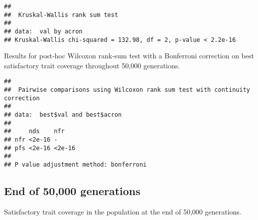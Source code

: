 \documentclass[]{book}
\newenvironment{Shaded}{\begin{snugshade}}{\end{snugshade}}
\newcommand{\DataTypeTok}[1]{\textcolor[rgb]{0.13,0.29,0.53}{#1}}
\newcommand{\KeywordTok}[1]{\textcolor[rgb]{0.13,0.29,0.53}{\textbf{#1}}}
\newcommand{\NormalTok}[1]{#1}
\newcommand{\OperatorTok}[1]{\textcolor[rgb]{0.81,0.36,0.00}{\textbf{#1}}}
\newcommand{\OtherTok}[1]{\textcolor[rgb]{0.56,0.35,0.01}{#1}}
\newcommand{\StringTok}[1]{\textcolor[rgb]{0.31,0.60,0.02}{#1}}
\begin{document}
\begin{verbatim}
## 
##  Kruskal-Wallis rank sum test
## 
## data:  val by acron
## Kruskal-Wallis chi-squared = 132.98, df = 2, p-value < 2.2e-16
\end{verbatim}

Results for post-hoc Wilcoxon rank-sum test with a Bonferroni correction on best satisfactory trait coverage throughout 50,000 generations.

\begin{Shaded}
\end{Shaded}

\begin{verbatim}
## 
##  Pairwise comparisons using Wilcoxon rank sum test with continuity correction 
## 
## data:  best$val and best$acron 
## 
##     nds    nfr   
## nfr <2e-16 -     
## pfs <2e-16 <2e-16
## 
## P value adjustment method: bonferroni
\end{verbatim}

\hypertarget{end-of-50000-generations-3}{%
\subsection{End of 50,000 generations}\label{end-of-50000-generations-3}}

Satisfactory trait coverage in the population at the end of 50,000 generations.
\end{document}
